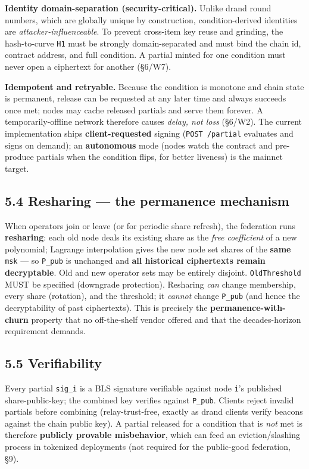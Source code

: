 \documentclass[
  11pt,
]{article}
\begin{document}
\textbf{Identity domain-separation (security-critical).} Unlike drand
round numbers, which are globally unique by construction,
condition-derived identities are \emph{attacker-influenceable}. To
prevent cross-item key reuse and grinding, the hash-to-curve \texttt{H1}
must be strongly domain-separated and must bind the chain id, contract
address, and full condition. A partial minted for one condition must
never open a ciphertext for another (§6/W7).

\textbf{Idempotent and retryable.} Because the condition is monotone and
chain state is permanent, release can be requested at any later time and
always succeeds once met; nodes may cache released partials and serve
them forever. A temporarily-offline network therefore causes
\emph{delay, not loss} (§6/W2). The current implementation ships
\textbf{client-requested} signing (\texttt{POST\ /partial} evaluates and
signs on demand); an \textbf{autonomous} mode (nodes watch the contract
and pre-produce partials when the condition flips, for better liveness)
is the mainnet target.

\subsection{5.4 Resharing --- the permanence
mechanism}\label{resharing-the-permanence-mechanism}

When operators join or leave (or for periodic share refresh), the
federation runs \textbf{resharing}: each old node deals its existing
share as the \emph{free coefficient} of a new polynomial; Lagrange
interpolation gives the new node set shares of the \textbf{same}
\texttt{msk} --- so \texttt{P\_pub} is unchanged and \textbf{all
historical ciphertexts remain decryptable}. Old and new operator sets
may be entirely disjoint. \texttt{OldThreshold} MUST be specified
(downgrade protection). Resharing \emph{can} change membership, every
share (rotation), and the threshold; it \emph{cannot} change
\texttt{P\_pub} (and hence the decryptability of past ciphertexts). This
is precisely the \textbf{permanence-with-churn} property that no
off-the-shelf vendor offered and that the decades-horizon requirement
demands.

\subsection{5.5 Verifiability}\label{verifiability}

Every partial \texttt{sig\_i} is a BLS signature verifiable against node
\texttt{i}'s published share-public-key; the combined key verifies
against \texttt{P\_pub}. Clients reject invalid partials before
combining (relay-trust-free, exactly as drand clients verify beacons
against the chain public key). A partial released for a condition that
is \emph{not} met is therefore \textbf{publicly provable misbehavior},
which can feed an eviction/slashing process in tokenized deployments
(not required for the public-good federation, §9).
\end{document}
